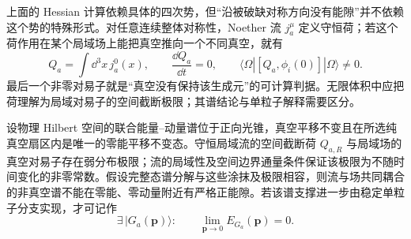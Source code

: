 上面的 Hessian 计算依赖具体的四次势，但“沿被破缺对称方向没有能隙”并不依赖这个势的特殊形式。对任意连续整体对称性，Noether 流 \(j_a^\mu\) 定义守恒荷；若这个荷作用在某个局域场上能把真空推向一个不同真空，就有
\begin{equation}
\boxed{
 Q_a=\int\dd^3 x\,j_a^0(x),
 \qquad
 \frac{\dd Q_a}{\dd t}=0,
 \qquad
 \langle\Omega|[Q_a,\phi_i(0)]|\Omega\rangle\neq0.}
\label{eq:goldstone-broken-charge-dp68}
\end{equation}
最后一个非零对易子就是“真空没有保持该生成元”的可计算判据。无限体积中应把荷理解为局域对易子的空间截断极限；其谱结论与单粒子解释需要区分。
\begin{theorem}[守恒局域荷的无能隙判据]
设物理 Hilbert 空间的联合能量--动量谱位于正向光锥，真空平移不变且在所选纯真空扇区内是唯一的零能平移不变态。守恒局域流的空间截断荷 $Q_{a,R}$ 与局域场的真空对易子存在弱分布极限；流的局域性及空间边界通量条件保证该极限为不随时间变化的非零常数。假设完整态谱分解与这些涂抹及极限相容，则流与场共同耦合的非真空谱不能在零能、零动量附近有严格正能隙。若该谱支撑进一步由稳定单粒子分支实现，才可记作
\begin{equation}
\boxed{
 \exists\,|G_a(\mathbf p)\rangle:
 \qquad
 \lim_{\mathbf p\to0}E_{G_a}(\mathbf p)=0.}
\label{eq:goldstone-gapless-spectrum-dp68}
\end{equation}
\end{theorem}
